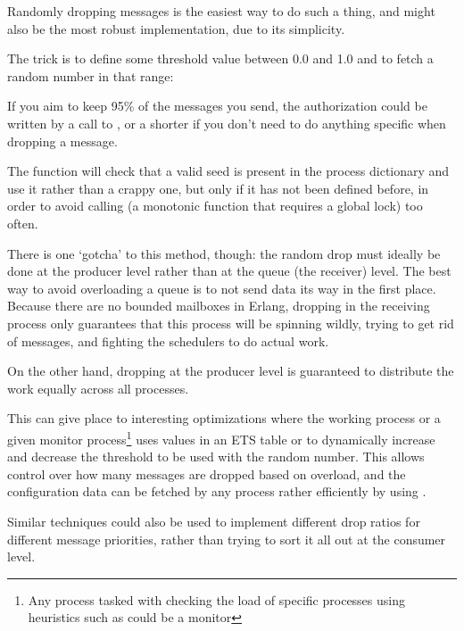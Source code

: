 Randomly dropping messages is the easiest way to do such a thing, and might also be the most robust implementation, due to its simplicity.

The trick is to define some threshold value between 0.0 and 1.0 and to fetch a random number in that range:


If you aim to keep 95\% of the messages you send, the authorization could be written by a call to , or a shorter  if you don't need to do anything specific when dropping a message.

The  function will check that a valid seed is present in the process dictionary and use it rather than a crappy one, but only if it has not been defined before, in order to avoid calling  (a monotonic function that requires a global lock) too often.

There is one `gotcha' to this method, though: the random drop must ideally be done at the producer level rather than at the queue (the receiver) level. The best way to avoid overloading a queue is to not send data its way in the first place. Because there are no bounded mailboxes in Erlang, dropping in the receiving process only guarantees that this process will be spinning wildly, trying to get rid of messages, and fighting the schedulers to do actual work.

On the other hand, dropping at the producer level is guaranteed to distribute the work equally across all processes.

This can give place to interesting optimizations where the working process or a given monitor process\footnote{Any process tasked with checking the load of specific processes using heuristics such as  could be a monitor} uses values in an ETS table or  to dynamically increase and decrease the threshold to be used with the random number. This allows control over how many messages are dropped based on overload, and the configuration data can be fetched by any process rather efficiently by using .

Similar techniques could also be used to implement different drop ratios for different message priorities, rather than trying to sort it all out at the consumer level.

